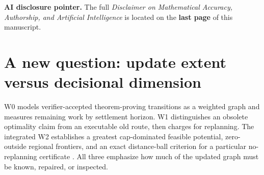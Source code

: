 \documentclass[11pt,letterpaper]{article}
\begin{document}
\noindent\textbf{AI disclosure pointer.} The full \emph{Disclaimer on Mathematical Accuracy, Authorship, and Artificial Intelligence} is located on the \textbf{last page} of this manuscript.
\begin{abstract}
A BANK update may change the settlement distance of arbitrarily many states, while an agent still needs only a certified decision at one state. The preceding W2 investigated region-supported lower potentials and a minimal distance-ball frontier within that certificate language. This article asks a distinct question: can the effect of several added transitions be represented \emph{exactly} through a finite interface to the old geometry, without first rebuilding the new geometry? For $k$ nonnegative added edges, we construct a graph of $k$ labeled portals plus a sink whose shortest paths, together with old point-to-portal distances, exactly determine each new settlement horizon. For one edge this reduces to a scalar min-plus formula and an exact characterization of the states whose horizons change. We prove that the complete old horizon vector and the announced new edge do \emph{not} by themselves determine the updated decision: an additional old distance-to-portal coordinate can be indispensable. Certified interval versions yield sound decisions without exact portal data. Finally, an explicit family separates the \emph{support cardinality} required by W2's zero-outside frontier representation from the constant-size old-distance portal summary sufficient for the same decision. This is a separation between certificate languages under named precomputation assumptions, not a universal runtime or proof-size lower bound. The central research object is the \emph{decision-relative portal quotient}: a compact, exact account of a global change relative to a fixed query workload. All results have mathematical proofs; none has been independently machine-verified, and historical originality remains unestablished.
\end{abstract}
\tableofcontents
\section{A new question: update extent versus decisional dimension}
W0 models verifier-accepted theorem-proving transitions as a weighted graph and measures remaining work by settlement horizon. W1 distinguishes an obsolete optimality claim from an executable old route, then charges for replanning. The integrated W2 establishes a greatest cap-dominated feasible potential, zero-outside regional frontiers, and an exact distance-ball criterion for a particular no-replanning certificate \cite{W0,W1,W2}. All three emphasize how much of the updated graph must be known, repaired, or inspected.
\end{document}
